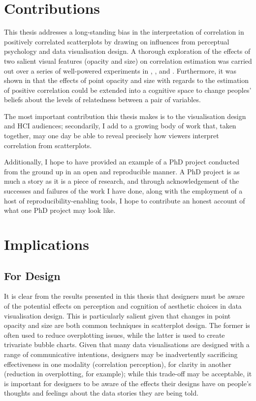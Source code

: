 \documentclass[../main.tex]{subfiles}
\begin{document}
\section{Contributions}\label{contributions-conclusion}

This thesis addresses a long-standing bias in the interpretation of
correlation in positively correlated scatterplots by drawing on
influences from perceptual psychology and data visualisation design. A
thorough exploration of the effects of two salient visual features
(opacity and size) on correlation estimation was carried out over a
series of well-powered experiments in ,
, and .
Furthermore, it was shown in  that the effects
of point opacity and size with regards to the estimation of positive
correlation could be extended into a cognitive space to change peoples'
beliefs about the levels of relatedness between a pair of variables.

The most important contribution this thesis makes is to the
visualisation design and HCI audiences; secondarily, I add to a growing
body of work that, taken together, may one day be able to reveal
precisely how viewers interpret correlation from scatterplots.

Additionally, I hope to have provided an example of a PhD project
conducted from the ground up in an open and reproducible manner. A PhD
project is as much a story as it is a piece of research, and through
acknowledgement of the successes and failures of the work I have done,
along with the employment of a host of reproducibility-enabling tools, I
hope to contribute an honest account of what one PhD project may look
like.

\section{Implications}\label{implications}

\subsection{For Design}\label{for-design}

It is clear from the results presented in this thesis that designers
must be aware of the potential effects on perception and cognition of
aesthetic choices in data visualisation design. This is particularly
salient given that changes in point opacity and size are both common
techniques in scatterplot design. The former is often used to reduce
overplotting issues, while the latter is used to create trivariate
bubble charts. Given that many data visualisations are designed with a
range of communicative intentions, designers may be inadvertently
sacrificing effectiveness in one modality (correlation perception), for
clarity in another (reduction in overplotting, for example); while this
trade-off may be acceptable, it is important for designers to be aware
of the effects their designs have on people's thoughts and feelings
about the data stories they are being told.
\end{document}
